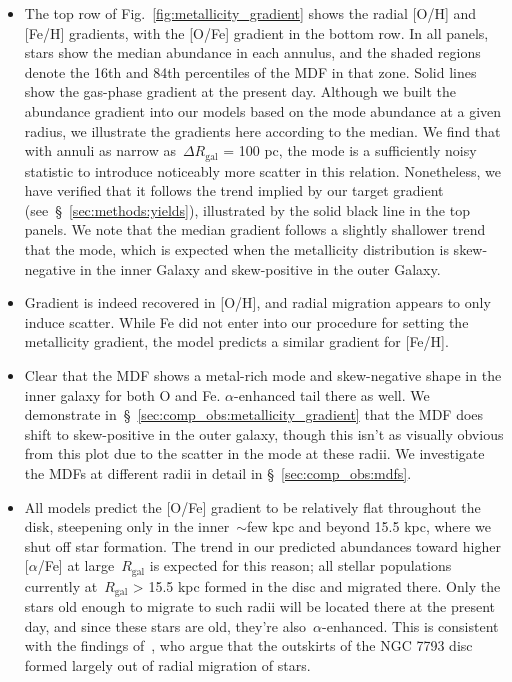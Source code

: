 \documentclass[fleqn, usenatbib]{mnras}
\begin{document}
\begin{itemize} 
	\item The top row of Fig.~\ref{fig:metallicity_gradient} shows the radial 
	[O/H] and [Fe/H] gradients, with the [O/Fe] gradient in the bottom row. In 
	all panels, stars show the median abundance in each annulus, and the shaded 
	regions denote the 16th and 84th percentiles of the MDF in that zone. Solid 
	lines show the gas-phase gradient at the present day. Although we built the 
	abundance gradient into our models based on the mode abundance at a given 
	radius, we illustrate the gradients here according to the median. We find 
	that with annuli as narrow as~$\Delta R_\text{gal}$ = 100 pc, the mode is a 
	sufficiently noisy statistic to introduce noticeably more scatter in this 
	relation. Nonetheless, we have verified that it follows the trend implied 
	by our target gradient (see~\S~\ref{sec:methods:yields}), illustrated by 
	the solid black line in the top panels. We note that the median gradient 
	follows a slightly shallower trend that the mode, which is expected when 
	the metallicity distribution is skew-negative in the inner Galaxy and 
	skew-positive in the outer Galaxy. 

	\item Gradient is indeed recovered in [O/H], and radial migration appears 
	to only induce scatter. While Fe did not enter into our procedure for 
	setting the metallicity gradient, the model predicts a similar gradient 
	for [Fe/H]. 

	\item Clear that the MDF shows a metal-rich mode and skew-negative shape 
	in the inner galaxy for both O and Fe. $\alpha$-enhanced tail there as 
	well. We demonstrate in~\S~\ref{sec:comp_obs:metallicity_gradient} that the 
	MDF does shift to skew-positive in the outer galaxy, though this isn't as 
	visually obvious from this plot due to the scatter in the mode at these 
	radii. We investigate the MDFs at different radii in detail in 
	\S~\ref{sec:comp_obs:mdfs}. 

	\item All models predict the [O/Fe] gradient to be relatively flat 
	throughout the disk, steepening only in the inner~$\sim$few kpc and beyond 
	15.5 kpc, where we shut off star formation. The trend in our predicted 
	abundances toward higher [$\alpha$/Fe] at large~$R_\text{gal}$ is expected 
	for this reason; all stellar populations currently at~$R_\text{gal}$ > 15.5 
	kpc formed in the disc and migrated there. Only the stars old enough to 
	migrate to such radii will be located there at the present day, and since 
	these stars are old, they're also~$\alpha$-enhanced. This is consistent 
	with the findings of~\citet{RadburnSmith2012}, who argue that the outskirts 
	of the NGC 7793 disc formed largely out of radial migration of stars. 


\end{itemize}
\end{document}
